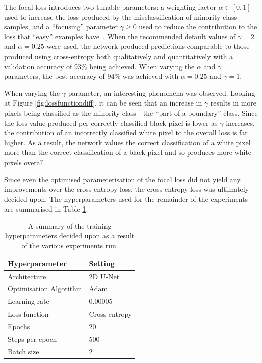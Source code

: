 The focal loss introduces two tunable parameters: a weighting factor $\alpha \in [0, 1]$ used to increase the loss produced by the misclassification of minority class samples, and a ``focusing'' parameter $\gamma \geq 0$ used to reduce the contribution to the loss that ``easy'' examples have~\cite{focalloss}. When the recommended default values of $\gamma=2$ and $\alpha=0.25$ were used, the network produced predictions comparable to those produced using cross-entropy both qualitatively and quantitatively with a validation accuracy of 93\% being achieved. When varying the $\alpha$ and $\gamma$ parameters, the best accuracy of 94\% was achieved with $\alpha=0.25$ and $\gamma=1$.

When varying the $\gamma$ parameter, an interesting phenomena was observed. Looking at Figure \ref{fig:lossfunctiondiff}, it can be seen that an increase in $\gamma$ results in more pixels being classified as the minority class---the ``part of a boundary'' class. Since the loss value produced per correctly classified black pixel is lower as $\gamma$ increases, the contribution of an incorrectly classified white pixel to the overall loss is far higher. As a result, the network values the correct classification of a white pixel more than the correct classification of a black pixel and so produces more white pixels overall.

Since even the optimised parameterisation of the focal loss did not yield any improvements over the cross-entropy loss, the cross-entropy loss was ultimately decided upon. The hyperparameters used for the remainder of the experiments are summarised in Table \ref{tab:hyperparams1}.

\begin{table}[t]
    \centering
    \caption{A summary of the training hyperparameters decided upon as a result of the various experiments run.}
    \begin{tabular}{@{}ll@{}}
    \toprule
    Hyperparameter   & Setting      \\ \midrule
    Architecture     & 2D U-Net   \\
    Optimisation Algorithm & Adam \\
    Learning rate & 0.00005 \\
    Loss function & Cross-entropy \\
    Epochs & 20 \\
    Steps per epoch & 500 \\
    Batch size & 2 \\ \bottomrule
    \end{tabular}
    \label{tab:hyperparams1}
\end{table}

